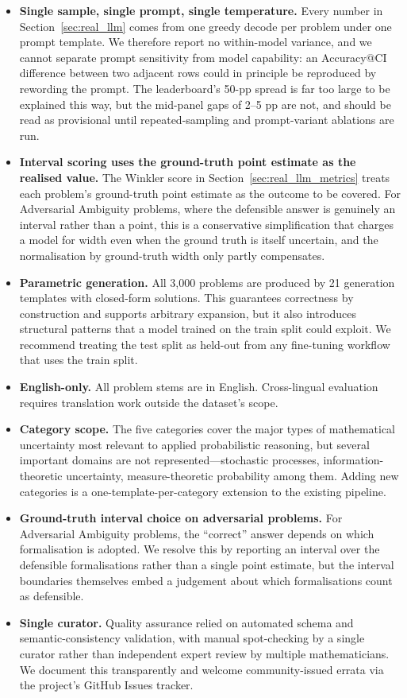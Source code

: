 \documentclass{article}
\begin{document}
\begin{itemize}[leftmargin=*,itemsep=3pt]
    \item \textbf{Single sample, single prompt, single temperature.} Every number in Section~\ref{sec:real_llm} comes from one greedy decode per problem under one prompt template. We therefore report no within-model variance, and we cannot separate prompt sensitivity from model capability: an Accuracy@CI difference between two adjacent rows could in principle be reproduced by rewording the prompt. The leaderboard's 50-pp spread is far too large to be explained this way, but the mid-panel gaps of 2--5 pp are not, and should be read as provisional until repeated-sampling and prompt-variant ablations are run.
    \item \textbf{Interval scoring uses the ground-truth point estimate as the realised value.} The Winkler score in Section~\ref{sec:real_llm_metrics} treats each problem's ground-truth point estimate as the outcome to be covered. For Adversarial Ambiguity problems, where the defensible answer is genuinely an interval rather than a point, this is a conservative simplification that charges a model for width even when the ground truth is itself uncertain, and the normalisation by ground-truth width only partly compensates.
    \item \textbf{Parametric generation.} All 3{,}000 problems are produced by 21 generation templates with closed-form solutions. This guarantees correctness by construction and supports arbitrary expansion, but it also introduces structural patterns that a model trained on the train split could exploit. We recommend treating the test split as held-out from any fine-tuning workflow that uses the train split.
    \item \textbf{English-only.} All problem stems are in English. Cross-lingual evaluation requires translation work outside the dataset's scope.
    \item \textbf{Category scope.} The five categories cover the major types of mathematical uncertainty most relevant to applied probabilistic reasoning, but several important domains are not represented---stochastic processes, information-theoretic uncertainty, measure-theoretic probability among them. Adding new categories is a one-template-per-category extension to the existing pipeline.
    \item \textbf{Ground-truth interval choice on adversarial problems.} For Adversarial Ambiguity problems, the ``correct'' answer depends on which formalisation is adopted. We resolve this by reporting an interval over the defensible formalisations rather than a single point estimate, but the interval boundaries themselves embed a judgement about which formalisations count as defensible.
    \item \textbf{Single curator.} Quality assurance relied on automated schema and semantic-consistency validation, with manual spot-checking by a single curator rather than independent expert review by multiple mathematicians. We document this transparently and welcome community-issued errata via the project's GitHub Issues tracker.
\end{itemize}
\end{document}
